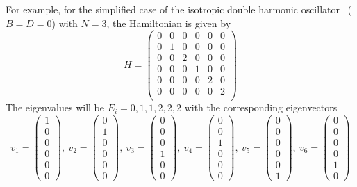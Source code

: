 \documentclass[../thesis.tex]{subfiles}
\begin{document}
For example, for the simplified case of the isotropic double harmonic oscillator \
(\(B=D=0\)) with \(N=3\), the Hamiltonian is given by
\[
H=
\begin{pmatrix}
  0 & 0 & 0 & 0 & 0 & 0\\
  0 & 1 & 0 & 0 & 0 & 0\\
  0 & 0 & 2 & 0 & 0 & 0\\
  0 & 0 & 0 & 1 & 0 & 0\\
  0 & 0 & 0 & 0 & 2 & 0\\
  0 & 0 & 0 & 0 & 0 & 2\\
\end{pmatrix}
\]
The eigenvalues will be \(E_i = 0, 1, 1, 2, 2, 2\) with the corresponding
eigenvectors
\[
  v_1 =
  \begin{pmatrix}
    1 \\ 0 \\ 0 \\ 0 \\ 0 \\ 0
  \end{pmatrix},\
  v_{2} =
  \begin{pmatrix}
    0 \\ 1 \\ 0 \\ 0 \\ 0 \\ 0
  \end{pmatrix},\
  v_{3} =
  \begin{pmatrix}
    0 \\ 0 \\ 0 \\ 1 \\ 0 \\ 0
  \end{pmatrix},\
  v_{4} =
  \begin{pmatrix}
    0 \\ 0 \\ 1 \\ 0 \\ 0 \\ 0
  \end{pmatrix},\
  v_{5} =
  \begin{pmatrix}
    0 \\ 0 \\ 0 \\ 0 \\ 0 \\ 1
  \end{pmatrix},\
  v_{6} =
  \begin{pmatrix}
    0 \\ 0 \\ 0 \\ 0 \\ 1 \\ 0
  \end{pmatrix}
\]
\end{document}
